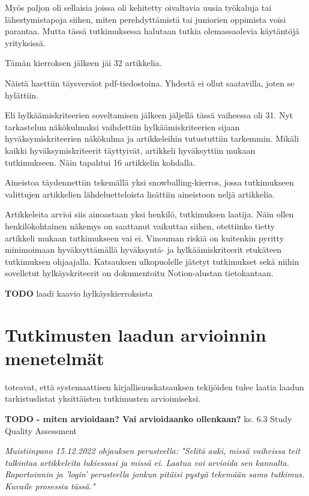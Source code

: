 \documentclass[utf8]{gradu3}
\begin{document}
Myös paljon oli sellaisia joissa oli kehitetty oivaltavia uusia työkaluja tai lähestymistapoja siihen, miten perehdyttämistä tai juniorien oppimista voisi parantaa. Mutta tässä tutkimuksessa halutaan tutkia olemassaolevia käytäntöjä yrityksissä.

Tämän kierroksen jälkeen jäi 32 artikkelia.

Näistä haettiin täysversiot pdf-tiedostoina. Yhdestä ei ollut saatavilla, joten se hylättiin.

Eli hylkäämiskriteerien soveltamisen jälkeen jäljellä tässä vaiheessa oli 31. Nyt tarkastelun näkökulmaksi vaihdettiin hylkäämiskriteerien sijaan hyväksymiskriteerien näkökulma ja artikkeleihin tutustuttiin tarkemmin. Mikäli kaikki hyväksymiskriteerit täyttyivät, artikkeli hyväksyttiin mukaan tutkimukseen. Näin tapahtui 16 artikkelin kohdalla.

Aineistoa täydennettiin tekemällä yksi snowballing-kierros, jossa tutkimukseen valittujen artikkelien lähdeluetteloista lisättiin aineistoon neljä artikkelia.

Artikkeleita arvioi siis ainoastaan yksi henkilö, tutkimuksen laatija. Näin ollen henkilökohtainen näkemys on saattanut vaikuttaa siihen, otettiinko tietty artikkeli mukaan tutkimukseen vai ei. Vinouman riskiä on kuitenkin pyritty minimoimaan hyväksyttämällä hyväksyntä- ja hylkäämiskriteerit etukäteen tutkimuksen ohjaajalla. Katsauksen ulkopuolelle jätetyt tutkimukset sekä niihin sovelletut hylkäyskriteerit on dokumentoitu Notion-alustan tietokantaan.

\textbf{TODO} laadi kaavio hylkäyskierroksista

\section{Tutkimusten laadun arvioinnin menetelmät}

\textcite{kitchenham-charters-2007} toteavat, että systemaattisen kirjallisuuskatsauksen tekijöiden tulee laatia laadun tarkistuslistat yksittäisten tutkimusten arvioimiseksi. 

\textbf{TODO - miten arvioidaan? Vai arvioidaanko ollenkaan?} ks. \parencite{kitchenham-charters-2007} 6.3 Study Quality Assessment

\textit{Muistiinpano 15.12.2022 ohjauksen perusteella: "Selitä auki, missä vaiheissa teit tulkintaa artikkeleita lukiessasi ja missä ei. Laatua voi arvioida sen kannalta. Raportoinnin ja 'login' perusteella jonkun pitäisi pystyä tekemään sama tutkimus. Kuvaile prosessia tässä."}
\end{document}
